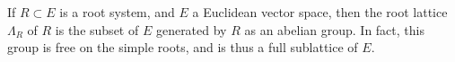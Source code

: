 \documentclass[12pt]{article}
\begin{document}
If $R\subset E$ is a root system, and $E$ a Euclidean vector space, then the root lattice 
$\Lambda_R$ of $R$ is the subset of $E$ generated by $R$ as an abelian group.  In fact, this
group is free on the simple roots, and is thus a full sublattice of $E$.
\end{document}
